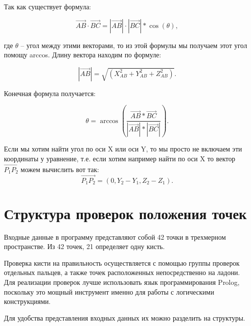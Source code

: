 \hspace{0.6cm} Так как существует формула:

\begin{equation} 
\displaystyle  \vec{AB} \cdot \vec{BC} = |\vec{AB}| \cdot |\vec{BC}| * \cos(\theta),
\end{equation}

\hspace{0.6cm} где $\theta$ – угол между этими векторами, то из этой формулы мы получаем этот угол помощу arccos. Длину вектора находим по формуле:

\begin{equation} 
\displaystyle  |\vec{AB}| = \sqrt{(X_{AB}^2 + Y_{AB}^2 + Z_{AB}^2)}.
\end{equation}

\hspace{0.6cm} Конечная формула получается:

\begin{equation} 
\displaystyle  \theta = \arccos(\frac{\vec{AB} * \vec{BC}}{|\vec{AB}| * |\vec{BC}|}).
\end{equation}

\hspace{0.6cm} Если мы хотим найти угол по оси X или оси Y, то мы просто не включаем эти координаты у уравнение, т.е. если хотим например найти по оси X то вектор $\vec{P_{1}P_{2}}$ можем вычислить вот так:
\begin{equation} 
\displaystyle  \vec{P_{1}P_{2}} = (0, Y_2 - Y_1, Z_2 - Z_1).
\end{equation} 
	

\section{Структура проверок положения точек}
\hspace{0.6cm} Входные данные в программу представляют собой 42 точки в трехмерном пространстве. Из 42 точек, 21 определяет одну кисть.

\hspace{0.6cm} Проверка кисти на правильность осуществляется с помощью группы проверок отдельных пальцев, а также точек расположенных непосредственно на ладони. Для реализации проверок лучше использовать язык программирования Prolog, поскольку это мощный инструмент именно для работы с логическими конструкциями.

\hspace{0.6cm} Для удобства представления входных данных их можно разделить на структуры. 


